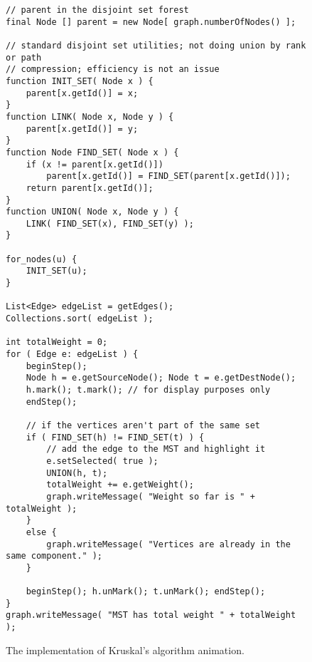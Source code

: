 \begin{figure}

{\small
\begin{verbatim}
// parent in the disjoint set forest
final Node [] parent = new Node[ graph.numberOfNodes() ];

// standard disjoint set utilities; not doing union by rank or path
// compression; efficiency is not an issue
function INIT_SET( Node x ) {
    parent[x.getId()] = x;
}
function LINK( Node x, Node y ) {
    parent[x.getId()] = y;
}
function Node FIND_SET( Node x ) {
    if (x != parent[x.getId()])
        parent[x.getId()] = FIND_SET(parent[x.getId()]);
    return parent[x.getId()];
}
function UNION( Node x, Node y ) {
	LINK( FIND_SET(x), FIND_SET(y) );
}

for_nodes(u) {
    INIT_SET(u);
}

List<Edge> edgeList = getEdges();
Collections.sort( edgeList );

int totalWeight = 0;
for ( Edge e: edgeList ) {
    beginStep();
    Node h = e.getSourceNode(); Node t = e.getDestNode();
    h.mark(); t.mark(); // for display purposes only
    endStep();

    // if the vertices aren't part of the same set
    if ( FIND_SET(h) != FIND_SET(t) ) {
        // add the edge to the MST and highlight it
        e.setSelected( true );
        UNION(h, t);
        totalWeight += e.getWeight();
        graph.writeMessage( "Weight so far is " + totalWeight );
    }
    else {
        graph.writeMessage( "Vertices are already in the same component." );
    }

    beginStep(); h.unMark(); t.unMark(); endStep();
}
graph.writeMessage( "MST has total weight " + totalWeight );
\end{verbatim}
} %

\caption{The implementation of Kruskal's algorithm animation.}
\label{fig:kruskals_algorithm}
\end{figure}
